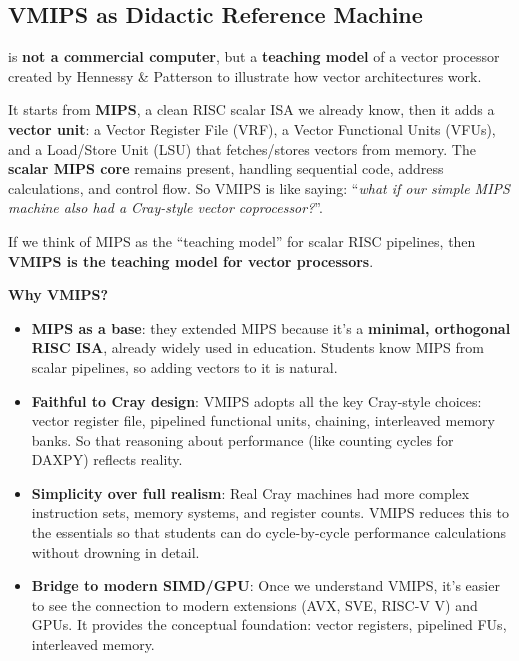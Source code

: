 \subsection{VMIPS as Didactic Reference Machine}

 is \textbf{not a commercial computer}, but a \textbf{teaching model} of a vector processor created by Hennessy \& Patterson \cite{hennessy2017computer} to illustrate how vector architectures work.

\highspace
It starts from \textbf{MIPS}, a clean RISC scalar ISA we already know, then it adds a \textbf{vector unit}: a Vector Register File (VRF), a Vector Functional Units (VFUs), and a Load/Store Unit (LSU) that fetches/stores vectors from memory. The \textbf{scalar MIPS core} remains present, handling sequential code, address calculations, and control flow. So VMIPS is like saying: ``\emph{what if our simple MIPS machine also had a Cray-style vector coprocessor?}''.

\highspace
If we think of MIPS as the ``teaching model'' for scalar RISC pipelines, then \textbf{VMIPS is the teaching model for vector processors}.

\highspace
\begin{flushleft}
    \textcolor{Green3}{ \textbf{Why VMIPS?}}
\end{flushleft}
\begin{itemize}
    \item \textbf{MIPS as a base}: they extended MIPS because it's a \textbf{minimal, orthogonal RISC ISA}, already widely used in education. Students know MIPS from scalar pipelines, so adding vectors to it is natural.
    \item \textbf{Faithful to Cray design}: VMIPS adopts all the key Cray-style choices: vector register file, pipelined functional units, chaining, interleaved memory banks. So that reasoning about performance (like counting cycles for DAXPY) reflects reality.
    \item \textbf{Simplicity over full realism}: Real Cray machines had more complex instruction sets, memory systems, and register counts. VMIPS reduces this to the essentials so that students can do cycle-by-cycle performance calculations without drowning in detail.
    \item \textbf{Bridge to modern SIMD/GPU}: Once we understand VMIPS, it's easier to see the connection to modern extensions (AVX, SVE, RISC-V V) and GPUs. It provides the conceptual foundation: vector registers, pipelined FUs, interleaved memory.
\end{itemize}

